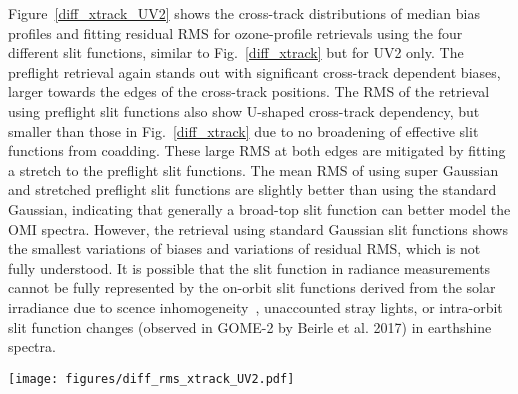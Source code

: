 \documentclass[amt,manuscript]{copernicus}
\begin{document}
Figure~\ref{diff_xtrack_UV2} shows the cross-track distributions of median bias profiles and fitting residual RMS for ozone-profile retrievals using the four different slit functions, similar to Fig.~\ref{diff_xtrack} but for UV2 only. The preflight retrieval again stands out with significant cross-track dependent biases, larger towards the edges of the cross-track positions. The RMS of the retrieval using preflight slit functions also show U-shaped cross-track dependency, but smaller than those in Fig.~\ref{diff_xtrack} due to no broadening of effective slit functions from coadding. These large RMS at both edges are mitigated by fitting a stretch to the preflight slit functions. The mean RMS of using super Gaussian and stretched preflight slit functions are slightly better than using the standard Gaussian, indicating that generally a broad-top slit function can better model the OMI spectra. However, the retrieval using standard Gaussian slit functions shows the smallest variations of biases and variations of residual RMS, which is not fully understood. It is possible that the slit function in radiance measurements cannot be fully represented by the on-orbit slit functions derived from the solar irradiance due to scence inhomogeneity~\citep{voors2006method,noel2012quantification}, unaccounted stray lights, or intra-orbit slit function changes (observed in GOME-2 by Beirle et al. 2017) in earthshine spectra.


\begin{figure*}[tbhp]
\texttt{[image: figures/diff\_rms\_xtrack\_UV2.pdf]}
\caption{Similar to Fig.\ref{diff_xtrack} but for the UV2 band only. Note there are 60, instead of 30 cross-track positions.}
\label{diff_xtrack_UV2}
\end{figure*}
\end{document}
